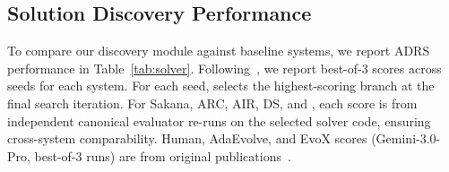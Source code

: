 
\subsection{Solution Discovery Performance}
\label{sec:exp:solver}

To compare our discovery module against baseline systems, we report ADRS performance in Table~\ref{tab:solver}. Following~\citet{cemri2026adaevolve}, we report best-of-3 scores across seeds for each system.
For each seed, \sys{} selects the highest-scoring branch at the final search iteration.
For Sakana, ARC, AIR, DS, and \sys{}, each score is from independent canonical evaluator re-runs on the selected solver code, ensuring cross-system comparability.
Human, AdaEvolve, and EvoX scores (Gemini-3.0-Pro, best-of-3 runs) are from original publications~\citep{cemri2026adaevolve,liu2026evox}.

\begin{table}[t]
\centering
\small
\caption{Solution discovery performance on ADRS benchmark tasks (best-of-3 seeds). Sakana/ARC/AIR/DS/\sys{} scores are from independent canonical evaluator re-runs on submitted solver code. Human, AdaEvolve, and EvoX scores are from original publications. $^*$~indicates Gemini-3.0-Pro, all other systems use Gemini-3.1-Pro.}
\label{tab:solver}
\setlength{\tabcolsep}{4pt}
\end{table}

